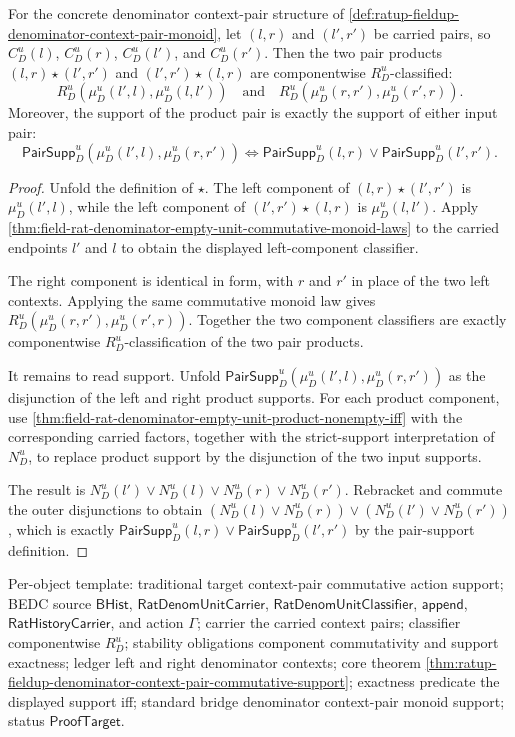 \begin{theorem}
\label{thm:ratup-fieldup-denominator-context-pair-commutative-support}
For the concrete denominator context-pair structure of
\autoref{def:ratup-fieldup-denominator-context-pair-monoid}, let $(l,r)$ and
$(l',r')$ be carried pairs, so $C_D^u(l)$, $C_D^u(r)$, $C_D^u(l')$, and
$C_D^u(r')$. Then the two pair products
$(l,r)\star(l',r')$ and $(l',r')\star(l,r)$ are componentwise
$R_D^u$-classified:
$$
R_D^u(\mu_D^u(l',l),\mu_D^u(l,l'))\quad\text{and}\quad
R_D^u(\mu_D^u(r,r'),\mu_D^u(r',r)).
$$
Moreover, the support of the product pair is exactly the support of either
input pair:
$$
\mathsf{PairSupp}_D^u(\mu_D^u(l',l),\mu_D^u(r,r'))
\Longleftrightarrow
\mathsf{PairSupp}_D^u(l,r)\lor\mathsf{PairSupp}_D^u(l',r').
$$
\end{theorem}
\begin{proof}
Unfold the definition of $\star$. The left component of
$(l,r)\star(l',r')$ is $\mu_D^u(l',l)$, while the left component of
$(l',r')\star(l,r)$ is $\mu_D^u(l,l')$. Apply
\autoref{thm:field-rat-denominator-empty-unit-commutative-monoid-laws} to the
carried endpoints $l'$ and $l$ to obtain the displayed left-component
classifier.

The right component is identical in form, with $r$ and $r'$ in place of the two
left contexts. Applying the same commutative monoid law gives
$R_D^u(\mu_D^u(r,r'),\mu_D^u(r',r))$. Together the two component classifiers are
exactly componentwise $R_D^u$-classification of the two pair products.

It remains to read support. Unfold
$\mathsf{PairSupp}_D^u(\mu_D^u(l',l),\mu_D^u(r,r'))$ as the disjunction of the
left and right product supports. For each product component, use
\autoref{thm:field-rat-denominator-empty-unit-product-nonempty-iff} with the
corresponding carried factors, together with the strict-support interpretation
of $N_D^u$, to replace product support by the disjunction of the two input
supports.

The result is
$N_D^u(l')\lor N_D^u(l)\lor N_D^u(r)\lor N_D^u(r')$. Rebracket and commute the
outer disjunctions to obtain
$(N_D^u(l)\lor N_D^u(r))\lor(N_D^u(l')\lor N_D^u(r'))$, which is exactly
$\mathsf{PairSupp}_D^u(l,r)\lor\mathsf{PairSupp}_D^u(l',r')$ by the
pair-support definition.
\end{proof}

Per-object template: traditional target context-pair commutative action support;
BEDC source $\mathsf{BHist}$,
$\mathsf{RatDenomUnitCarrier}$, $\mathsf{RatDenomUnitClassifier}$,
$\mathsf{append}$, $\mathsf{RatHistoryCarrier}$, and action $\Gamma$; carrier
the carried context pairs; classifier componentwise $R_D^u$; stability
obligations component commutativity and support exactness; ledger left and right
denominator contexts; core theorem
\autoref{thm:ratup-fieldup-denominator-context-pair-commutative-support};
exactness predicate the displayed support iff; standard bridge denominator
context-pair monoid support; status $\mathsf{ProofTarget}$.

